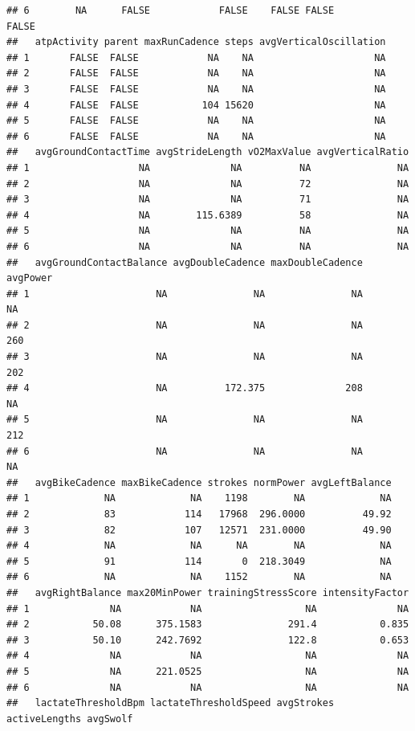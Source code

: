 \documentclass[
]{book}
\begin{document}
\begin{verbatim}
## 6        NA      FALSE            FALSE    FALSE FALSE              FALSE
##   atpActivity parent maxRunCadence steps avgVerticalOscillation
## 1       FALSE  FALSE            NA    NA                     NA
## 2       FALSE  FALSE            NA    NA                     NA
## 3       FALSE  FALSE            NA    NA                     NA
## 4       FALSE  FALSE           104 15620                     NA
## 5       FALSE  FALSE            NA    NA                     NA
## 6       FALSE  FALSE            NA    NA                     NA
##   avgGroundContactTime avgStrideLength vO2MaxValue avgVerticalRatio
## 1                   NA              NA          NA               NA
## 2                   NA              NA          72               NA
## 3                   NA              NA          71               NA
## 4                   NA        115.6389          58               NA
## 5                   NA              NA          NA               NA
## 6                   NA              NA          NA               NA
##   avgGroundContactBalance avgDoubleCadence maxDoubleCadence avgPower
## 1                      NA               NA               NA       NA
## 2                      NA               NA               NA      260
## 3                      NA               NA               NA      202
## 4                      NA          172.375              208       NA
## 5                      NA               NA               NA      212
## 6                      NA               NA               NA       NA
##   avgBikeCadence maxBikeCadence strokes normPower avgLeftBalance
## 1             NA             NA    1198        NA             NA
## 2             83            114   17968  296.0000          49.92
## 3             82            107   12571  231.0000          49.90
## 4             NA             NA      NA        NA             NA
## 5             91            114       0  218.3049             NA
## 6             NA             NA    1152        NA             NA
##   avgRightBalance max20MinPower trainingStressScore intensityFactor
## 1              NA            NA                  NA              NA
## 2           50.08      375.1583               291.4           0.835
## 3           50.10      242.7692               122.8           0.653
## 4              NA            NA                  NA              NA
## 5              NA      221.0525                  NA              NA
## 6              NA            NA                  NA              NA
##   lactateThresholdBpm lactateThresholdSpeed avgStrokes activeLengths avgSwolf

\end{verbatim}
\end{document}
